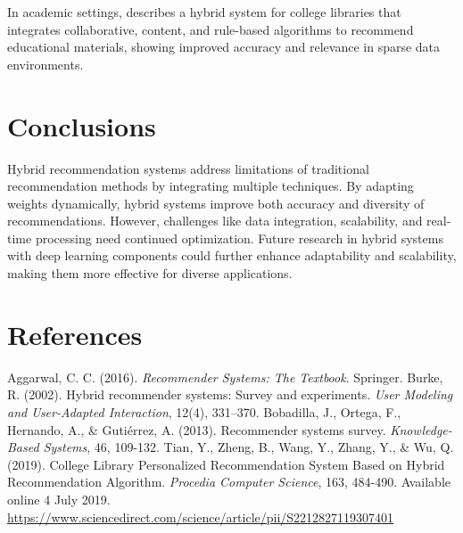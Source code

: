 \documentclass{article}
\begin{document}
In academic settings, \cite{Tian2019} describes a hybrid system for college libraries that integrates collaborative, content, and rule-based algorithms to recommend educational materials, showing improved accuracy and relevance in sparse data environments.

\section{Conclusions}

Hybrid recommendation systems address limitations of traditional recommendation methods by integrating multiple techniques. By adapting weights dynamically, hybrid systems improve both accuracy and diversity of recommendations. However, challenges like data integration, scalability, and real-time processing need continued optimization. Future research in hybrid systems with deep learning components could further enhance adaptability and scalability, making them more effective for diverse applications.

\section{References}

\begin{itemize}
     Aggarwal, C. C. (2016). \textit{Recommender Systems: The Textbook}. Springer.
     Burke, R. (2002). Hybrid recommender systems: Survey and experiments. \textit{User Modeling and User-Adapted Interaction}, 12(4), 331–370.
     Bobadilla, J., Ortega, F., Hernando, A., \& Gutiérrez, A. (2013). Recommender systems survey. \textit{Knowledge-Based Systems}, 46, 109-132.
     Tian, Y., Zheng, B., Wang, Y., Zhang, Y., \& Wu, Q. (2019). College Library Personalized Recommendation System Based on Hybrid Recommendation Algorithm. \textit{Procedia Computer Science}, 163, 484-490. Available online 4 July 2019. \url{https://www.sciencedirect.com/science/article/pii/S2212827119307401}
\end{itemize}
\end{document}

